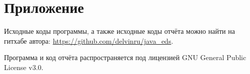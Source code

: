 \section{Приложение}

Исходные коды программы, а также исходные коды отчёта можно найти на гитхабе автора: \url{https://github.com/delvinru/java_eds}.

Программа и код отчёта распространяется под лицензией GNU General Public License v3.0.
